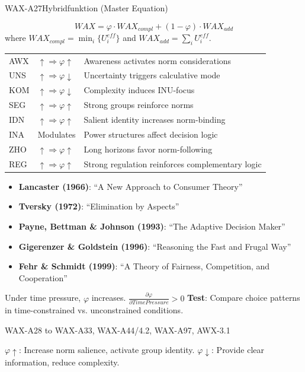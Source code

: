 \begin{axiomspec}{WAX-A27}{Hybridfunktion (Master Equation)}

\begin{equation}
WAX = \varphi \cdot WAX_{compl} + (1-\varphi) \cdot WAX_{add}
\end{equation}
where $WAX_{compl} = \min_i\{U_i^{eff}\}$ and $WAX_{add} = \sum_i U_i^{eff}$.

\begin{tabular}{lll}
AWX & $\uparrow \Rightarrow \varphi \uparrow$ & Awareness activates norm considerations \\
UNS & $\uparrow \Rightarrow \varphi \downarrow$ & Uncertainty triggers calculative mode \\
KOM & $\uparrow \Rightarrow \varphi \downarrow$ & Complexity induces INU-focus \\
SEG & $\uparrow \Rightarrow \varphi \uparrow$ & Strong groups reinforce norms \\
IDN & $\uparrow \Rightarrow \varphi \uparrow$ & Salient identity increases norm-binding \\
INA & Modulates & Power structures affect decision logic \\
ZHO & $\uparrow \Rightarrow \varphi \uparrow$ & Long horizons favor norm-following \\
REG & $\uparrow \Rightarrow \varphi \uparrow$ & Strong regulation reinforces complementary logic \\
\end{tabular}

\begin{itemize}
\item \textbf{Lancaster (1966)}: ``A New Approach to Consumer Theory''
\item \textbf{Tversky (1972)}: ``Elimination by Aspects''
\item \textbf{Payne, Bettman \& Johnson (1993)}: ``The Adaptive Decision Maker''
\item \textbf{Gigerenzer \& Goldstein (1996)}: ``Reasoning the Fast and Frugal Way''
\item \textbf{Fehr \& Schmidt (1999)}: ``A Theory of Fairness, Competition, and Cooperation''
\end{itemize}

Under time pressure, $\varphi$ increases. $\frac{\partial \varphi}{\partial TimePressure} > 0$
\textbf{Test}: Compare choice patterns in time-constrained vs. unconstrained conditions.

WAX-A28 to WAX-A33, WAX-A44/4.2, WAX-A97, AWX-3.1

$\varphi \uparrow$: Increase norm salience, activate group identity.
$\varphi \downarrow$: Provide clear information, reduce complexity.

\end{axiomspec}

